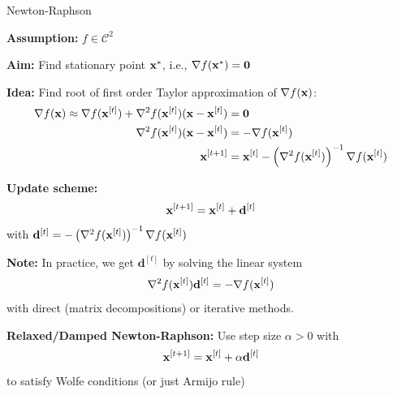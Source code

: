 \documentclass[11pt,compress,t,notes=noshow, xcolor=table]{beamer}
\begin{document}
\begin{vbframe}{Newton-Raphson}

\textbf{Assumption:} $f \in \mathcal{C}^2$

\medskip

\textbf{Aim:} Find stationary point $\mathbf{x}^\ast$, i.e., $\nabla f(\mathbf{x}^\ast) = \mathbf{0}$

\medskip

\textbf{Idea:} Find root of first order Taylor approximation of $\nabla f(\mathbf{x})$:
\begin{align*}
    \nabla f(\mathbf{x}) \approx \nabla f(\mathbf{x}^{[t]}) +
    \nabla^2 f(\mathbf{x}^{[t]})(\mathbf{x} - \mathbf{x}^{[t]}) &= \mathbf{0} \\
    \nabla^2 f(\mathbf{x}^{[t]})(\mathbf{x} - \mathbf{x}^{[t]}) &= - \nabla f(\mathbf{x}^{[t]}) \\
    \mathbf{x}^{[t+1]} &= \mathbf{x}^{[t]} - \left(\nabla^2 f(\mathbf{x}^{[t]})\right)^{-1}\nabla f(\mathbf{x}^{[t]})
\end{align*}

\textbf{Update scheme:}
\begin{equation*}
    \mathbf{x}^{[t+1]} = \mathbf{x}^{[t]} + \mathbf{d}^{[t]}
\end{equation*}
with $\mathbf{d}^{[t]} = - \left(\nabla^2 f(\mathbf{ x}^{[t]})\right)^{-1}\nabla f(\mathbf{x}^{[t]})$

\framebreak

\textbf{Note: } In practice, we get $\mathbf{d}^{[t]}$ by solving the linear system
\begin{equation*}
    \nabla^2 f(\mathbf{x}^{[t]})\mathbf{d}^{[t]} = - \nabla f(\mathbf{x}^{[t]})
\end{equation*}
with direct (matrix decompositions) or iterative methods. 

\medskip

\textbf{Relaxed/Damped Newton-Raphson:} Use step size $\alpha > 0$ with
\begin{equation*}
    \mathbf{x}^{[t+1]} = \mathbf{x}^{[t]} + \alpha \mathbf{d}^{[t]}
\end{equation*}
to satisfy Wolfe conditions (or just Armijo rule)


\end{vbframe}
\end{document}
